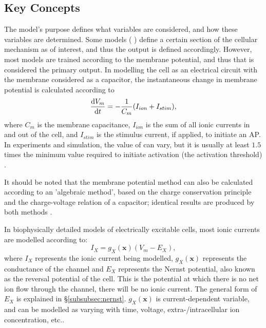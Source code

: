 \documentclass[../thesis-main.tex]{subfiles}
\begin{document}
\subsection{Key Concepts}
\label{subsec:model-concepts}
The model's purpose defines what variables are considered, and how these variables are determined. Some models (\eg{} \citet{Restrepo2008}) define a certain section of the cellular mechanism as of interest, and thus the output is defined accordingly. However, most models are trained according to the membrane potential, and thus that is considered the primary output. In modelling the cell as an electrical circuit with the membrane considered as a capacitor, the instantaneous change in membrane potential is calculated according to
\begin{equation}
 \frac{\textnormal{d}V_m}{\textnormal{d}t} = -\frac{1}{C_m}(I_{ion}+I_{stim}),
\end{equation}
where $C_m$ is the membrane capacitance, $I_{ion}$ is the sum of all ionic currents in and out of the cell, and $I_{stim}$ is the stimulus current, if applied, to initiate an AP. In experiments and simulation, the value of \istim{} can vary, but it is usually at least $1.5$ times the minimum value required to initiate activation (the activation threshold) \citep{Sutton2000, Riccio1999, Ferrero2003}.

It should be noted that the membrane potential method can also be calculated according to an 'algebraic method', based on the charge conservation principle and the charge-voltage relation of a capacitor; identical results are produced by both methods \citep{Hund2001, Rudy2006}.

In biophysically detailed models of electrically excitable cells, most ionic currents are modelled according to:
\begin{equation}
 I_X = g_X(\mathbf{x})(V_m-E_X), \label{eq:ion-current}
\end{equation}
where $I_X$ represents the ionic current being modelled, $g_X(\mathbf{x})$ represents the conductance of the channel and $E_X$ represents the Nernst potential, also known as the reversal potential of the cell. This is the potential at which there is no net ion flow through the channel, \idest{} there will be no ionic current. The general form of $E_X$ is explained in \S\ref{subsubsec:nernst}. $g_X(\mathbf{x})$ is current-dependent variable, and can be modelled as varying with time, voltage, extra-/intracellular ion concentration, etc..
\end{document}
